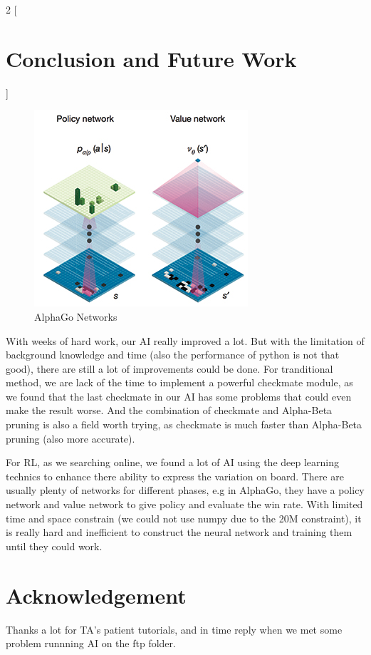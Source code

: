 \documentclass[a4paper, 12pt]{article} %
\begin{document}
	\begin{multicols}{2}
		[
		\section{Conclusion and Future Work}
		]
		\begin{figure}[H]
			\centering
			\includegraphics[scale=0.5]{Network.jpg}
			\caption{AlphaGo Networks}
		\end{figure}
		With weeks of hard work, our AI really improved a lot. But with the limitation of background knowledge and time (also the performance of python is not that good), there are still a lot of improvements could be done. For tranditional method, we are lack of the time to implement a powerful checkmate module, as we found that the last checkmate in our AI has some problems that could even make the result worse. And the combination of checkmate and Alpha-Beta pruning is also a field worth trying, as checkmate is much faster than Alpha-Beta pruning (also more accurate).
		
		For RL, as we searching online, we found a lot of AI using the deep learning technics to enhance there ability to express the variation on board. There are usually plenty of networks for different phases, e.g in AlphaGo, they have a policy network and value network to give policy and evaluate the win rate. With limited time and space constrain (we could not use numpy due to the 20M constraint), it is really hard and inefficient to construct the neural network and training them until they could work.
		
	\end{multicols}

	\section{Acknowledgement}
		Thanks a lot for TA's patient tutorials, and in time reply when we met some problem runnning AI on the ftp folder.
		
\end{document}
